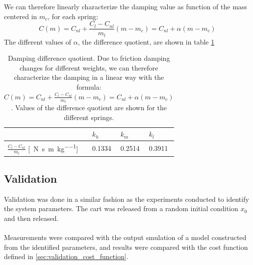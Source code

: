 We can therefore linearly characterize the damping value as function of the mass centered in $m_c$, for each spring:
$$C(m)=C_{nl}+ \frac{C_{l}-C_{nl}}{m_{l}}(m -m_{c}) = C_{nl} +\alpha (m-m_{c})$$
The different values of $\alpha$, the difference quotient, are shown in table \ref{table: cart_detached_damping_quotient}

\begin{table}[!h]
\centering
\label{table: cart_detached_damping_quotient}
\begin{tabular}{|l|l|l|l|}
\hline
 & \textbf{$k_h$} & \textbf{$k_m$}   & \textbf{$k_l$}   \\ \hline
$\frac{C_{l}-C_{nl}}{m_{l}}$ [\SI{}{\newton \second \per \metre \per \kilo\gram}]       &0.1334   & 0.2514 & 0.3911 \\ \hline
\end{tabular}
\caption{Damping difference quotient. Due to friction damping changes for different weights, we can therefore characterize the damping in a linear way with the formula: $C(m)=C_{nl}+ \frac{C_{l}-C_{nl}}{m_{l}}(m -m_{c})= C_{nl} +\alpha (m-m_{c})$. Values of the difference quotient are shown for the different springs.}
\end{table}


\subsection{Validation}
Validation was done in a similar fashion as the experiments conducted to identify the system parameters. The cart was released from a random initial condition $x_0$  and then released. \\ \\ 
Measurements  were compared with the output smulation of a model constructed from the identified parameters, and results were compared with the cost function defined in \ref{sec:validation_cost_function}.


